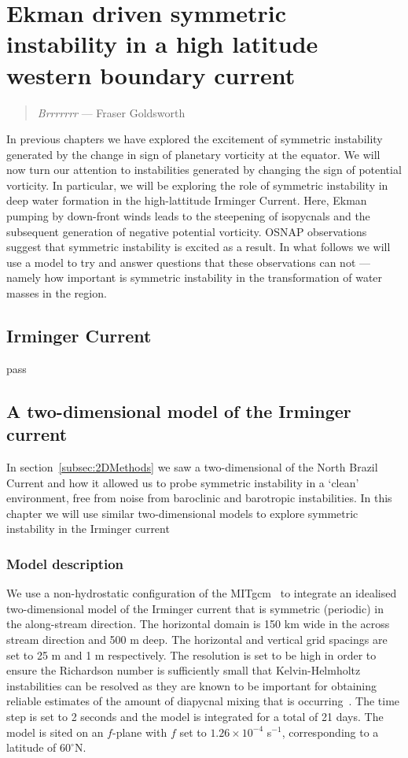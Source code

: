 \chapter{Ekman driven symmetric instability in a high latitude western boundary current}
\begin{quote}
    \textit{Brrrrrrr} --- Fraser Goldsworth
\end{quote}

In previous chapters we have explored the excitement of symmetric instability generated by the change in sign of planetary vorticity at the equator. We will now turn our attention to instabilities generated by changing the sign of potential vorticity. In particular, we will be exploring the role of symmetric instability in deep water formation in the high-lattitude Irminger Current. Here, Ekman pumping by down-front winds leads to the steepening of isopycnals and the subsequent generation of negative potential vorticity. OSNAP observations suggest that symmetric instability is excited as a result. In what follows we will use a model to try and answer questions that these observations can not --- namely how important is symmetric instability in the transformation of water masses in the region.

\section{Irminger Current}
pass
\section{A two-dimensional model of the Irminger current}
In section~\ref{subsec:2DMethods} we saw a two-dimensional of the North Brazil Current and how it allowed us to probe symmetric instability in a `clean' environment, free from noise from baroclinic and barotropic instabilities. In this chapter we will use similar two-dimensional models to explore symmetric instability in the Irminger current
\subsection{Model description}
We use a non-hydrostatic configuration of the MITgcm~\citep{Marshall1997} to integrate an idealised two-dimensional model of the Irminger current that is symmetric (periodic) in the along-stream direction. The horizontal domain is 150 km wide in the across stream direction and 500 m deep. The horizontal and vertical grid spacings are set to 25 m and 1 m respectively. The resolution is set to be high in order to ensure the Richardson number is sufficiently small that Kelvin-Helmholtz instabilities can be resolved as they are known to be important for obtaining reliable estimates of the amount of diapycnal mixing that is occurring~\citep{Griffiths2003a, Yankovsky2019}. The time step is set to 2 seconds and the model is integrated for a total of 21 days. The model is sited on an $f$-plane with $f$ set to $1.26 \times 10^{-4}$ s$^{-1}$, corresponding to a latitude of $60^\circ$N. 


